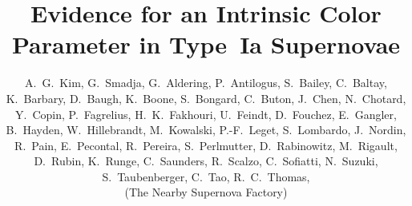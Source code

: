 \documentclass{aastex}   	%
\begin{document}
\title{Evidence for an Intrinsic Color Parameter in Type~Ia Supernovae}
\author
{
    A.~G.~Kim,
    G.~Smadja, 
    G.~Aldering,
    P.~Antilogus,
    S.~Bailey,
    C.~Baltay,
    K.~Barbary,
    D.~Baugh,
    K.~Boone,
    S.~Bongard,
    C.~Buton,
    J.~Chen,
    N.~Chotard,
    Y.~Copin,
    P.~Fagrelius,
    H.~K.~Fakhouri,
    U.~Feindt,
    D.~Fouchez,
    E.~Gangler,  
    B.~Hayden,
    W.~Hillebrandt,
    M.~Kowalski,
    P.-F.~Leget,
    S.~Lombardo,
    J.~Nordin,
    R.~Pain, 
    E.~Pecontal,
    R.~Pereira,
    S.~Perlmutter,
    D.~Rabinowitz,
    M.~Rigault, 
    D.~Rubin,
    K.~Runge,
    C.~Saunders,
   R.~Scalzo,
    C.~Sofiatti, 
    N.~Suzuki,
    S.~Taubenberger,
    C.~Tao,
    R.~C.~Thomas, \\
    (The Nearby Supernova Factory)
}
\end{document}
